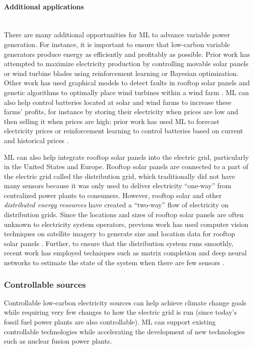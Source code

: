 \documentclass[11pt]{report}
\begin{document}
\paragraph{Additional applications}\mbox{}\\
There are many additional opportunities for ML to advance variable power generation. For instance, it is important to ensure that low-carbon variable generators produce energy as efficiently and profitably as possible. Prior work has attempted to maximize electricity production by controlling movable solar panels \cite{abel2018bandit, abdelrahman2016bayesian} or wind turbine blades \cite{kolter2012design} using reinforcement learning or Bayesian optimization. Other work has used graphical models to detect faults in rooftop solar panels \cite{iyengar2018solarclique} and genetic algorithms to optimally place wind turbines within a wind farm \cite{dilkina2015method}.
ML can also help control batteries located at solar and wind farms to increase these farms' profits, for instance by storing their electricity when prices are low and then selling it when prices are high; prior work has used ML to forecast electricity prices \cite{weron2014electricity, lago2018forecasting} or reinforcement learning to control batteries based on current and historical prices \cite{wang2018energy}.

ML can also help integrate rooftop solar panels into the electric grid, particularly in the United States and Europe. Rooftop solar panels are connected to a part of the electric grid called the distribution grid, which traditionally did not have many sensors because it was only used to  deliver electricity ``one-way'' from centralized power plants to consumers. However, rooftop solar and other \emph{distributed energy resources} have created a ``two-way'' flow of electricity on distribution grids. Since the locations and sizes of rooftop solar panels are often unknown to electricity system operators, previous work has used computer vision techniques on satellite imagery to generate size and location data for rooftop solar panels \cite{malof2016automatic, yu2018deepsolar}. Further, to ensure that the distribution system runs smoothly, recent work has employed techniques such as matrix completion and deep neural networks to estimate the state of the system when there are few sensors \cite{donti2018matrix, jiang2016short, pertl2016voltage}.

\subsubsection{Controllable sources}
\label{sec:electricity-controllable}
Controllable low-carbon electricity sources can help achieve climate change goals while requiring very few changes to how the electric grid is run (since today's fossil fuel power plants are also controllable). ML can support existing controllable technologies while accelerating the development of new technologies such as nuclear fusion power plants.
\end{document}
